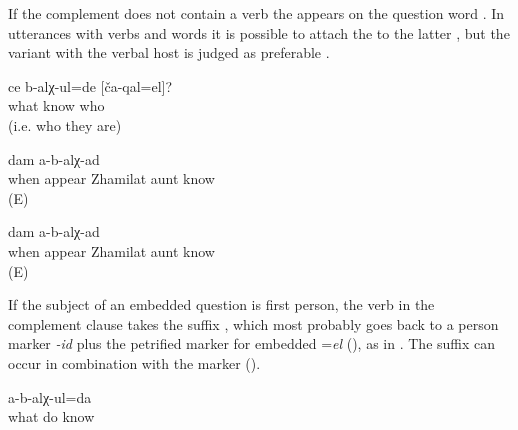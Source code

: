 If the complement does not contain a verb the  appears on the question word . In utterances with verbs and  words it is possible to attach the  to the latter , but the variant with the verbal host is judged as preferable .
%
\begin{exe}
	\ex	\label{ex:How do you know them}
	\gll	ce	b-alχ-ul=de	[ča-qal=el]?\\
		what	know	who\\
	\glt	{} (i.e. who they are)

	\ex	\label{ex:‎I don't know when aunt Zhamilat was bornA}
	\gll	[ceqːel=el	hak'-ub-ce	žamilat	azi]	dam	a-b-alχ-ad\\
		when	appear	Zhamilat	aunt		know\\
	\glt	{} (E)

	\ex	\label{ex:‎I don't know when aunt Zhamilat was bornB}
	\gll	[ceqːel	hak'-ub-ce=jal	žamilat	azi]	dam	a-b-alχ-ad\\
		when	appear	Zhamilat	aunt		know\\
	\glt	{} (E)
\end{exe}

If the subject of an embedded question is first person, the verb in the complement clause takes the  suffix , which most probably goes back to a person marker \textit{-id} plus the petrified marker for embedded  =\textit{el} (), as in . The suffix can occur in combination with the  marker ().
%
\begin{exe}
	\ex	\label{ex:I do not know what to do}
	\gll	[ce	b-arq'-ide=l]	a-b-alχ-ul=da\\
		what	do	know\\
	\glt	{}
\end{exe}



